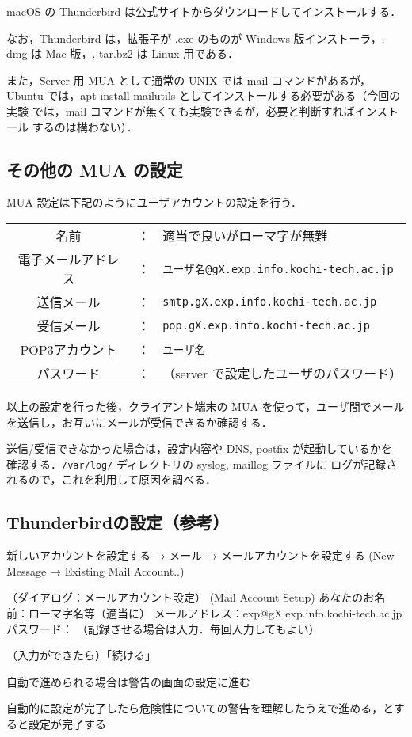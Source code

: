 macOS の Thunderbird は公式サイトからダウンロードしてインストールする．

なお，Thunderbird は，拡張子が .exe のものが Windows 版インストーラ，.
dmg は Mac 版，.  tar.bz2 は Linux 用である．

また，Server 用 MUA として通常の UNIX では mail コマンドがあるが，Ubuntu 
では，apt install mailutils としてインストールする必要がある（今回の実験
では，mail コマンドが無くても実験できるが，必要と判断すればインストール
するのは構わない）．

\subsection*{その他の MUA の設定}

MUA 設定は下記のようにユーザアカウントの設定を行う．

\begin{center}
\begin{breakbox}
\begin{tabular}{ccl}
名前&：&適当で良いがローマ字が無難\\
電子メールアドレス&：&\texttt{ユーザ名@gX.exp.info.kochi-tech.ac.jp}\\
送信メール&：&\texttt{smtp.gX.exp.info.kochi-tech.ac.jp}\\
受信メール&：&\texttt{pop.gX.exp.info.kochi-tech.ac.jp}\\
POP3アカウント&：&\texttt{ユーザ名}\\
パスワード&：&（server で設定したユーザのパスワード）
\end{tabular}
\end{breakbox}
\end{center}

以上の設定を行った後，クライアント端末の MUA を使って，ユーザ間でメール
を送信し，お互いにメールが受信できるか確認する．

送信/受信できなかった場合は，設定内容や DNS, postfix が起動しているかを
確認する．\texttt{/var/log/} ディレクトリの syslog, maillog ファイルに
ログが記録されるので，これを利用して原因を調べる．

\subsection*{Thunderbirdの設定（参考）}

\begin{cli}
新しいアカウントを設定する → メール → メールアカウントを設定する
(New Message → Existing Mail Account..)

（ダイアログ：メールアカウント設定）
  (Mail Account Setup)
あなたのお名前：ローマ字名等（適当に）
メールアドレス：exp@gX.exp.info.kochi-tech.ac.jp
パスワード： （記録させる場合は入力．毎回入力してもよい）

（入力ができたら）「続ける」

自動で進められる場合は警告の画面の設定に進む

自動的に設定が完了したら危険性についての警告を理解したうえで進める，とすると設定が完了する
\end{cli}

